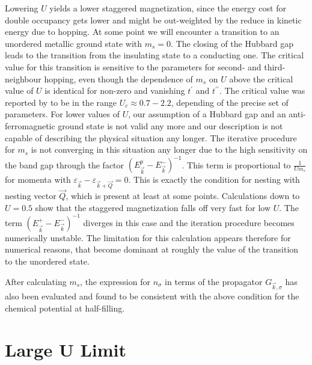 Lowering $U$ yields a lower staggered magnetization, since the energy cost for double occupancy gets lower and might be out-weighted by
the reduce in kinetic energy due to hopping.
%
At some point we will encounter a transition to an unordered metallic ground state with $m_s=0$. 
The closing of the Hubbard gap leads to the transition from the insulating state to a conducting one.
The critical value for this transition is sensitive to the parameters for second- and third-neighbour hopping, 
even though the dependence of $m_s$ on $U$ above the critical value of $U$ is identical for non-zero and vanishing $t^{\prime}$ and $t^{\prime \prime}$.
The critical value was reported by \citet{PhysRevB.88.035111} to be in the range $U_c \approx 0.7 - 2.2$, depending of the precise set of parameters.
For lower values of $U$, our assumption of a Hubbard gap and an anti-ferromagnetic ground state is not valid any more
and our description is not capable of describing the physical situation any longer. 
The iterative procedure for $m_s$ is not converging in this situation any longer due to the high sensitivity on the band gap through the factor $(E^p_{\vec k} - E^-_{\vec k})^{-1}$.
This term is proportional to $\frac{1}{Um_s}$ for momenta with $\varepsilon_{\vec k} - \varepsilon_{\vec k+\vec Q} =0$.
This is exactly the condition for nesting with nesting vector $\vec Q$, which is present at least at some points.
Calculations down to $U=0.5$ show that the staggered magnetization falls off very fast for low $U$. 
The term $(E^+_{\vec k} -E^-_{\vec k})^{-1}$ diverges in this case and the iteration procedure becomes numerically unstable. 
The limitation for this calculation appears therefore for numerical reasons, that become dominant at roughly the value of the transition to the unordered state.

After calculating $m_{s}$, the expression for $n_{\sigma}$ in terms of the propagator $G_{\vec k,\sigma}$ has also been evaluated 
and found to be consistent with the above condition for the chemical potential at half-filling.



\section{Large U Limit}

